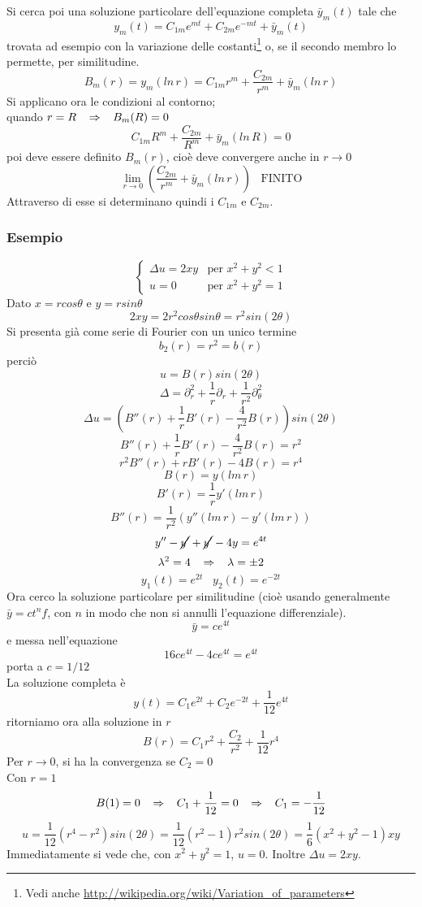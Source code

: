 Si cerca poi una soluzione particolare dell'equazione completa $\bar{y}_m(t)$
tale che
\[
	y_m(t)= C_{1m}e^{mt} + C_{2m}e^{-mt} + \bar{y}_m(t)
\]
trovata ad esempio con la variazione delle costanti\footnote{
Vedi anche \url{http://wikipedia.org/wiki/Variation_of_parameters}}
o, se il secondo membro lo permette, per similitudine.
\[
	B_m (r)= y_m(ln \, r) = C_{1m}r^m + \frac{C_{2m}}{r^m} + \bar{y}_m(ln \,
r)
\]
Si applicano ora le condizioni al contorno;\\
quando $r=R \;\;\; \Rightarrow \;\;\; B_m (R)=0$
\[
	C_{1m}R^m + \frac{C_{2m}}{R^m} + \bar{y}_m(ln \, R)=0
\]
poi deve essere definito $B_m(r)$, cio\`e deve convergere anche in $r \to 0$
\[
	\lim_{r \to 0} \left(
	\frac{C_{2m}}{r^m} + \bar{y}_m(ln \, r) \right) \;\;\; \text{FINITO}
\]
Attraverso di esse si determinano quindi i $C_{1m}$ e $C_{2m}$.
\subsubsection{Esempio}
\[
	\left\{
	\begin{array}{ll}
		\Delta u= 2xy	& \text{per } x^2 +y^2 <1 \\
		u=0		& \text{per } x^2+y^2=1
	\end{array}
	\right.
\]
Dato $x= rcos \theta$ e $y= rsin\theta$
\[
	2xy= 2r^2 cos \theta sin \theta= r^2 sin(2\theta)
\]
Si presenta gi\`a come serie di Fourier con un unico termine
\[
	b_2(r)=r^2= b(r)
\]
perci\`o
\[
	u= B(r) sin(2\theta)
\]
\[
	\Delta = \partial_r^2 +\frac{1}{r}\partial_r +
\frac{1}{r^2}\partial_{\theta}^2
\]
\[
	\Delta u= \left(
	B''(r) + \frac{1}{r} B' (r) - \frac{4}{r^2} B(r)
	\right) sin (2 \theta)
\]
\[
	B''(r) +\frac{1}{r}B'(r) - \frac{4}{r^2}B(r)= r^2
\]
\[
	r^2 B''(r) +rB'(r) - 4B(r)= r^4
\]
\[
	B(r)= y(lm \, r)
\]
\[
	B'(r)= \frac{1}{r}y'(lm \, r)
\]
\[
	B''(r)= \frac{1}{r^2}\left( y''(lm \, r) - y'(lm \, r) \right)
\]
\[
	y'' - \cancel{y'} + \cancel{y'} - 4y= e^{4t}
\]
\[
	\lambda^2=4 \;\;\; \Rightarrow \;\;\; \lambda=\pm 2
\]
\[
	y_1(t)= e^{2t} \;\;\; y_2(t)= e^{-2t}
\]
Ora cerco la soluzione particolare per similitudine (cio\`e usando
generalmente $\bar{y}= c t^n f$, con $n$ in modo che non si annulli
l'equazione differenziale).
\[
	\bar{y}= c e^{4t}
\]
e messa nell'equazione
\[
	16ce^{4t} - 4ce^{4t}= e^{4t}
\]
porta a $c= 1/12$\\
La soluzione completa \`e
\[
	y(t)= C_1e^{2t} + C_2e^{-2t} + \frac{1}{12}e^{4t}
\]
ritorniamo ora alla soluzione in $r$
\[
	B(r)= C_1 r^2 + \frac{C_2}{r^2} + \frac{1}{12}r^4
\]
Per $r \to 0$, si ha la convergenza se $C_2=0$\\
Con $r=1$
\[
	B(1)=0 \;\;\; \Rightarrow \;\;\; C_1+ \frac{1}{12}=0 \;\;\; \Rightarrow \;\;\; C_1= - \frac{1}{12}
\]
\[
	u= \frac{1}{12}(r^4 - r^2)sin(2 \theta)= \frac{1}{12}(r^2 -1)r^2 sin(2\theta) =
	\frac{1}{6}(x^2 + y^2 -1)xy
\]
Immediatamente si vede che, con $x^2 + y^2 =1$, $u=0$.
Inoltre $\Delta u= 2xy$.

